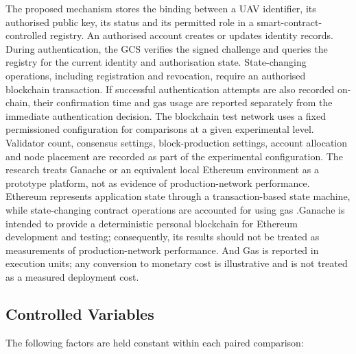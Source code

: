 The proposed mechanism stores the binding between a UAV identifier, its authorised public key, its status and its permitted role in a smart-contract-controlled registry. An authorised account creates or updates identity records. During authentication, the GCS verifies the signed challenge and queries the registry for the current identity and authorisation state. State-changing operations, including registration and revocation, require an authorised blockchain transaction. If successful authentication attempts are also recorded on-chain, their confirmation time and gas usage are reported separately from the immediate authentication decision.
\noindent
The blockchain test network uses a fixed permissioned configuration for comparisons at a given experimental level. Validator count, consensus settings, block-production settings, account allocation and node placement are recorded as part of the experimental configuration. The research treats Ganache or an equivalent local Ethereum environment as a prototype platform, not as evidence of production-network performance. Ethereum represents application state through a transaction-based state
machine, while state-changing contract operations are accounted for
using gas \cite{Wood2025Ethereum}.Ganache is intended to provide a deterministic personal blockchain for Ethereum development and testing; consequently, its results should not be treated as measurements of production-network performance\cite{GanacheDocumentation}. And Gas is reported in execution units; any conversion to monetary cost is illustrative and is not treated as a measured deployment cost.

\subsection{Controlled Variables}
\label{subsec:controlled-variables}

The following factors are held constant within each paired comparison:

